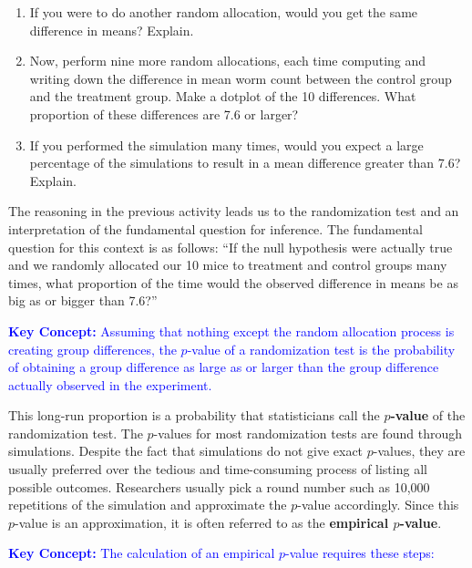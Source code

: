 \documentclass[
]{report}
\begin{document}
\begin{enumerate}
\def\labelenumi{\arabic{enumi}.}
\setcounter{enumi}{3}
\item
  If you were to do another random allocation, would you get the same difference in means? Explain.
\item
  Now, perform nine more random allocations, each time computing and writing down the difference in mean worm count between the control group and the treatment group. Make a dotplot of the 10 differences. What proportion of these differences are 7.6 or larger?
\item
  If you performed the simulation many times, would you expect a large percentage of the simulations to result in a mean difference greater than 7.6? Explain.
\end{enumerate}

The reasoning in the previous activity leads us to the randomization test and an interpretation of the fundamental question for inference. The fundamental question for this context is as follows: ``If the null hypothesis were actually true and we randomly allocated our 10 mice to treatment and control groups many times, what proportion of the time would the observed difference in means be as big as or bigger than 7.6?''

\textbf{\textcolor{blue}{Key Concept:}}
\textcolor{blue}{Assuming that nothing except the random allocation process is creating group differences, the $\scriptstyle p$-value of a randomization test is the probability of obtaining a group difference as large as or larger than the group difference actually observed in the experiment.}

This long-run proportion is a probability that statisticians call the \textbf{\(\scriptstyle p\)-value} of the randomization test. The \(\scriptstyle p\)-values for most randomization tests are found through simulations. Despite the fact that simulations do not give exact \(\scriptstyle p\)-values, they are usually preferred over the tedious and time-consuming process of listing all possible outcomes. Researchers usually pick a round number such as 10,000 repetitions of the simulation and approximate the \(\scriptstyle p\)-value accordingly. Since this \(\scriptstyle p\)-value is an approximation, it is often referred to as the \textbf{empirical \(\scriptstyle p\)-value}.

\textbf{\textcolor{blue}{Key Concept:}} \textcolor{blue}{The calculation of an empirical $\scriptstyle p$-value requires these steps:}\vspace*{-\baselineskip}
\end{document}
